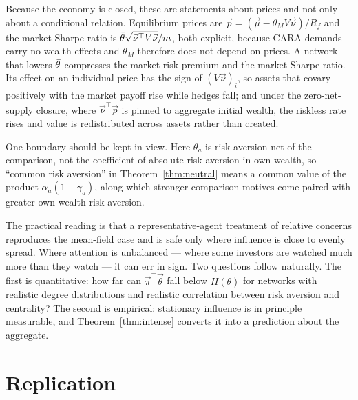 Because the economy is closed, these are statements about prices and not only
about a conditional relation. Equilibrium prices are
$\vec p=(\vec\mu-\theta_MV\vec\nu)/R_f$ and the market Sharpe ratio is
$\bar\theta\sqrt{\vec\nu^{\top}V\vec\nu}/m$, both explicit, because CARA demands carry
no wealth effects and $\theta_M$ therefore does not depend on prices. A network that lowers $\bar\theta$ compresses the market risk premium and the market
Sharpe ratio. Its effect on an individual price has the sign of
$(V\vec\nu)_i$, so assets that covary positively with the market payoff rise
while hedges fall; and under the zero-net-supply closure, where
$\vec\nu^{\top}\vec p$ is pinned to aggregate initial wealth, the riskless rate
rises and value is redistributed across assets rather than created.

One boundary should be kept in view. Here $\theta_a$ is risk aversion net of the
comparison, not the coefficient of absolute risk aversion in own wealth, so
``common risk aversion'' in Theorem~\ref{thm:neutral} means a common value of
the product $\alpha_a(1-\gamma_a)$, along which stronger comparison motives come
paired with greater own-wealth risk aversion.

The practical reading is that a representative-agent treatment of relative
concerns reproduces the mean-field case and is safe only where influence is
close to evenly spread. Where attention is unbalanced --- where some investors
are watched much more than they watch --- it can err in sign. Two questions
follow naturally. The first is quantitative: how far can
$\vec\pi^{\top}\vec\theta$ fall below $H(\theta)$ for networks with realistic
degree distributions and realistic correlation between risk aversion and
centrality? The second is empirical: stationary influence is in principle
measurable, and Theorem~\ref{thm:intense} converts it into a prediction about
the aggregate.

\section*{Replication}
\label{sec:replication}

